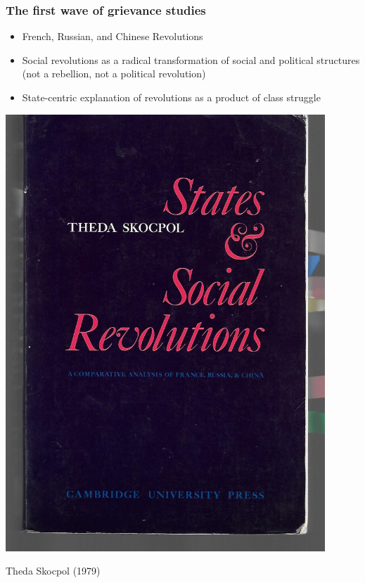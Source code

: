 \documentclass[aspectratio=43]{beamer}
\begin{document}
\begin{frame}
\frametitle{The first wave of grievance studies}
\centering

\begin{minipage}{0.59\textwidth}\centering
\begin{itemize}
  \item French, Russian, and Chinese Revolutions
  \item Social revolutions as a radical transformation of social and political structures (not a rebellion, not a political revolution)
  \item State-centric explanation of revolutions as a product of class struggle
\end{itemize}
\end{minipage}\hfill
\begin{minipage}{0.4\textwidth}\centering
\includegraphics[width = 0.9\textwidth]{img/skocpol}

Theda Skocpol (1979)
\end{minipage}

\end{frame}
\end{document}
